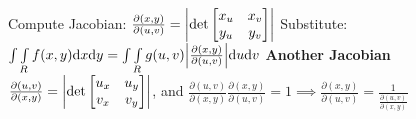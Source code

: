 \documentclass[twoside]{article}
\DeclarePairedDelimiter{\abs}{\lvert}{\rvert}
\begin{document}
\indent\indent Compute Jacobian: $\frac{\partial{(x,y)}}{\partial{(u,v)}} = \abs*{\det\begin{bmatrix} x_u & x_v\\ y_u & y_v\end{bmatrix}}$\newline
\indent\indent Substitute: $\int\int\limits_R f(x,y)\mathrm{d}x\mathrm{d}y = \int\int\limits_R g(u,v) \abs*{\frac{\partial{(x,y)}}{\partial{(u,v)}}}\mathrm{d}u\mathrm{d}v$\newline
\indent\textbf{Another Jacobian}\newline
\indent\indent $\frac{\partial{(u,v)}}{\partial{(x,y)}} = \abs*{\det\begin{bmatrix} u_x & u_y\\ v_x & v_y\end{bmatrix}}$, and $\frac{\partial{(u,v)}}{\partial{(x,y)}} \frac{\partial{(x,y)}}{\partial{(u,v)}} = 1 \implies \frac{\partial{(x,y)}}{\partial{(u,v)}} = \frac{1}{\frac{\partial{(u,v)}}{\partial{(x,y)}}} $
\end{document}
